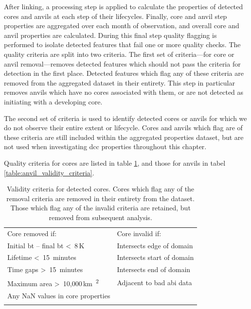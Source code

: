 After linking, a processing step is applied to calculate the properties of detected cores and anvils at each step of their lifecycles.
Finally, core and anvil step properties are aggregated over each month of observation, and overall core and anvil properties are calculated.
During this final step quality flagging is performed to isolate detected features that fail one or more quality checks.
The quality criteria are split into two criteria.
The first set of criteria---for core or anvil removal---removes detected features which should not pass the criteria for detection in the first place.
Detected features which flag any of these criteria are removed from the aggregated dataset in their entirety.
This step in particular removes anvils which have no cores associated with them, or are not detected as initiating with a developing core.

The second set of criteria is used to identify detected cores or anvils for which we do not observe their entire extent or lifecycle.
Cores and anvils which flag are of these criteria are still included within the aggregated properties dataset, but are not used when investigating \acrshort{dcc} properties throughout this chapter.

Quality criteria for cores are listed in table \ref{table:core_validity_criteria}, and those for anvils in tabel \ref{table:anvil_validity_criteria}.

\begin{table}[tb]
\centering
\begin{tabular}{ll}
\tophline
Core removed if:                                                    & Core invalid if: \\
\middlehline
Initial \acrshort{bt} -- final \acrshort{bt} \textless~8\,\unit{K}  & Intersects edge of domain \\
Lifetime \textless~15~minutes                                       & Intersects start of domain \\
Time gaps \textgreater~15~minutes                                   & Intersects end of domain \\
Maximum area \textgreater~10,000\,\unit{km\textsuperscript{2}}      & Adjacent to bad \acrshort{abi} data \\
Any NaN values in core properties                                   & \\
\bottomhline
\end{tabular}
\caption[
Validity criteria for detected cores
]{
Validity criteria for detected cores. Cores which flag any of the removal criteria are removed in their entirety from the dataset. Those which flag any of the invalid criteria are retained, but removed from subsequent analysis.}
\label{table:core_validity_criteria}
\end{table}


